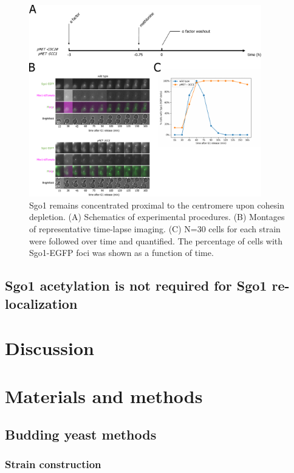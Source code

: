 \begin{figure}[htbp]
  \centering
  \includegraphics[width=0.9\textwidth]{chapter3/figures/Sgo1 pMET-SCC1.pdf}
  \caption[Sgo1 remains concentrated proximal to the centromere upon cohesin depletion]{Sgo1 remains concentrated proximal to the centromere upon cohesin depletion. (A) Schematics of experimental procedures. (B) Montages of representative time-lapse imaging. (C) N=30 cells for each strain were followed over time and quantified. The percentage of cells with Sgo1-EGFP foci was shown as a function of time. }
  \label{fig:sgo1metscc1}
\end{figure}


\subsection{Sgo1 acetylation is not required for Sgo1 re-localization}

\section{Discussion}
\section{Materials and methods}
\subsection{Budding yeast methods}
\subsubsection{Strain construction}
